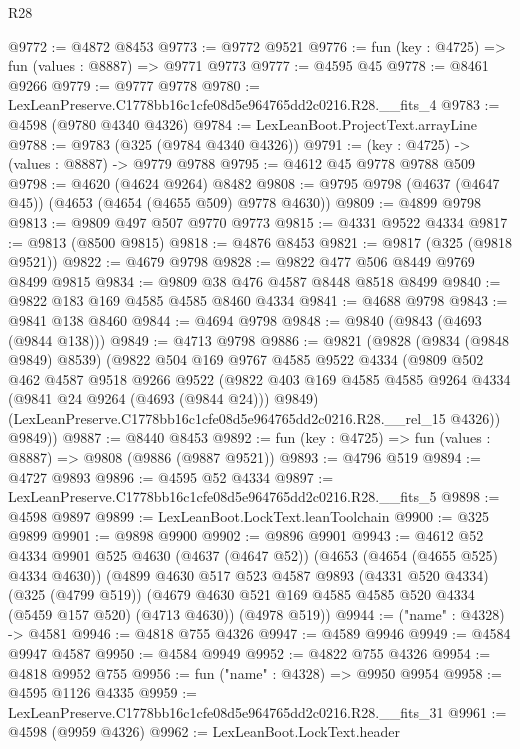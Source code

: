 \begin{lexlean}{R28}
\begin{coremodule}
@9772 := @4872 @8453
@9773 := @9772 @9521
@9776 := fun (key : @4725) => fun (values : @8887) => @9771 @9773
@9777 := @4595 @45
@9778 := @8461 @9266
@9779 := @9777 @9778
@9780 := LexLeanPreserve.C1778bb16c1cfe08d5e964765dd2c0216.R28.__fits_4
@9783 := @4598 (@9780 @4340 @4326)
@9784 := LexLeanBoot.ProjectText.arrayLine
@9788 := @9783 (@325 (@9784 @4340 @4326))
@9791 := (key : @4725) -> (values : @8887) -> @9779 @9788
@9795 := @4612 @45 @9778 @9788 @509
@9798 := @4620 (@4624 @9264) @8482
@9808 := @9795 @9798 (@4637 (@4647 @45)) (@4653 (@4654 (@4655 @509) @9778 @4630))
@9809 := @4899 @9798
@9813 := @9809 @497 @507 @9770 @9773
@9815 := @4331 @9522 @4334
@9817 := @9813 (@8500 @9815)
@9818 := @4876 @8453
@9821 := @9817 (@325 (@9818 @9521))
@9822 := @4679 @9798
@9828 := @9822 @477 @506 @8449 @9769 @8499 @9815
@9834 := @9809 @38 @476 @4587 @8448 @8518 @8499
@9840 := @9822 @183 @169 @4585 @4585 @8460 @4334
@9841 := @4688 @9798
@9843 := @9841 @138 @8460
@9844 := @4694 @9798
@9848 := @9840 (@9843 (@4693 (@9844 @138)))
@9849 := @4713 @9798
@9886 := @9821
    (@9828
      (@9834 (@9848 @9849) @8539)
      (@9822
        @504
        @169
        @9767
        @4585
        @9522
        @4334
        (@9809
          @502
          @462
          @4587
          @9518
          @9266
          @9522
          (@9822 @403 @169 @4585 @4585 @9264 @4334 (@9841 @24 @9264 (@4693 (@9844 @24))) @9849)
          (LexLeanPreserve.C1778bb16c1cfe08d5e964765dd2c0216.R28.__rel_15 @4326))
        @9849))
@9887 := @8440 @8453
@9892 := fun (key : @4725) => fun (values : @8887) => @9808 (@9886 (@9887 @9521))
@9893 := @4796 @519
@9894 := @4727 @9893
@9896 := @4595 @52 @4334
@9897 := LexLeanPreserve.C1778bb16c1cfe08d5e964765dd2c0216.R28.__fits_5
@9898 := @4598 @9897
@9899 := LexLeanBoot.LockText.leanToolchain
@9900 := @325 @9899
@9901 := @9898 @9900
@9902 := @9896 @9901
@9943 := @4612
    @52
    @4334
    @9901
    @525
    @4630
    (@4637 (@4647 @52))
    (@4653 (@4654 (@4655 @525) @4334 @4630))
    (@4899
      @4630
      @517
      @523
      @4587
      @9893
      (@4331 @520 @4334)
      (@325 (@4799 @519))
      (@4679 @4630 @521 @169 @4585 @4585 @520 @4334 (@5459 @157 @520) (@4713 @4630))
      (@4978 @519))
@9944 := ("name" : @4328) -> @4581
@9946 := @4818 @755 @4326
@9947 := @4589 @9946
@9949 := @4584 @9947 @4587
@9950 := @4584 @9949
@9952 := @4822 @755 @4326
@9954 := @4818 @9952 @755
@9956 := fun ("name" : @4328) => @9950 @9954
@9958 := @4595 @1126 @4335
@9959 := LexLeanPreserve.C1778bb16c1cfe08d5e964765dd2c0216.R28.__fits_31
@9961 := @4598 (@9959 @4326)
@9962 := LexLeanBoot.LockText.header

\end{coremodule}
\end{lexlean}
